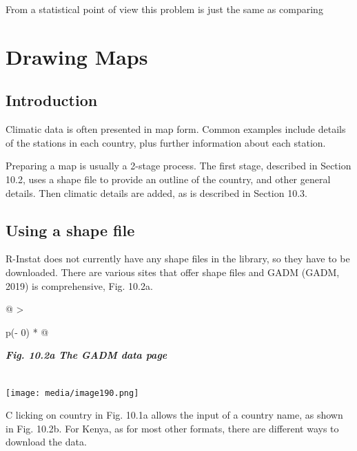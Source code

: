 \documentclass[
  letterpaper,
  DIV=11,
  numbers=noendperiod]{scrreprt}
\begin{document}
From a statistical point of view this problem is just the same as
comparing


\chapter{Drawing Maps}\label{drawing-maps}

\section{Introduction}\label{introduction-9}

Climatic data is often presented in map form. Common examples include
details of the stations in each country, plus further information about
each station.

Preparing a map is usually a 2-stage process. The first stage, described
in Section 10.2, uses a shape file to provide an outline of the country,
and other general details. Then climatic details are added, as is
described in Section 10.3.

\section{Using a shape file}\label{using-a-shape-file}

R-Instat does not currently have any shape files in the library, so they
have to be downloaded. There are various sites that offer shape files
and GADM (GADM, 2019) is comprehensive, Fig. 10.2a.

\begin{longtable}[]{@{}
  >{\raggedright\arraybackslash}p{(\columnwidth - 0\tabcolsep) * }@{}}
\toprule\noalign{}
\begin{minipage}[b]{\linewidth}\raggedright
\textbf{\emph{Fig. 10.2a The GADM data page}}
\end{minipage} \\
\midrule\noalign{}
\endhead
\bottomrule\noalign{}
\endlastfoot
\texttt{[image: media/image190.png]} \\
\end{longtable}

C licking on country in Fig. 10.1a allows the input of a country name,
as shown in Fig. 10.2b. For Kenya, as for most other formats, there are
different ways to download the data.
\end{document}
